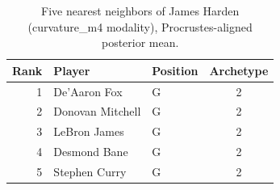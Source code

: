 \begin{table}[htbp]
  \centering\small
  \begin{tabular}{rllc}
    \toprule
    Rank & Player & Position & Archetype \\
    \midrule
    1 & De'Aaron Fox & G & 2 \\
    2 & Donovan Mitchell & G & 2 \\
    3 & LeBron James & G & 2 \\
    4 & Desmond Bane & G & 2 \\
    5 & Stephen Curry & G & 2 \\
    \bottomrule
  \end{tabular}
  \caption{Five nearest neighbors of James Harden (curvature_m4 modality), Procrustes-aligned posterior mean.}
  \label{tab:James_Harden_neighbors_curvature_m4}
\end{table}

